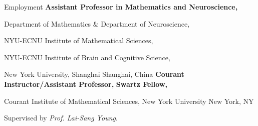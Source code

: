 \begin{rubric}{Employment}
\entry*[2024/01 -- ]%
	\textbf{Assistant Professor in Mathematics and Neuroscience,} %
	\par Department of Mathematics \& Department of Neuroscience, 
        \par NYU-ECNU Institute of Mathematical Sciences,
        \par NYU-ECNU Institute of Brain and Cognitive Science,
        \par New York University, Shanghai \hfill Shanghai, China
\entry*[2021 -- 2023]%
	\textbf{Courant Instructor/Assistant Professor,} 
%
%
\entry*[2020 -- 2021]%
	\textbf{Swartz Fellow,} %
	\par Courant Institute of Mathematical Sciences, New York University \hfill New York, NY
	\par Supervised by \textit{Prof. Lai-Sang Young}.
%
\end{rubric}